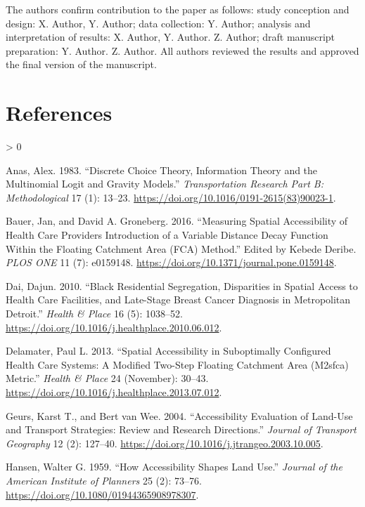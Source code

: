 \documentclass{article}
\newlength{\cslhangindent}
\newenvironment{CSLReferences}[2] %
 {%
  \setlength{\parindent}{0pt}
  \ifodd #1 \everypar{\setlength{\hangindent}{\cslhangindent}}\ignorespaces\fi
  \ifnum #2 > 0
  \setlength{\parskip}{#2\baselineskip}
  \fi
 }%
 {}
\begin{document}
The authors confirm contribution to the paper as follows: study
conception and design: X. Author, Y. Author; data collection: Y. Author;
analysis and interpretation of results: X. Author, Y. Author. Z. Author;
draft manuscript preparation: Y. Author. Z. Author. All authors reviewed
the results and approved the final version of the manuscript.

\hypertarget{references}{%
\section*{References}\label{references}}

\hypertarget{refs}{}
\begin{CSLReferences}{1}{0}
\leavevmode\hypertarget{ref-anas1983}{}%
Anas, Alex. 1983. {``Discrete Choice Theory, Information Theory and the
Multinomial Logit and Gravity Models.''} \emph{Transportation Research
Part B: Methodological} 17 (1): 13--23.
\url{https://doi.org/10.1016/0191-2615(83)90023-1}.

\leavevmode\hypertarget{ref-bauer2016}{}%
Bauer, Jan, and David A. Groneberg. 2016. {``Measuring Spatial
Accessibility of Health Care Providers {{}} Introduction of a Variable
Distance Decay Function Within the Floating Catchment Area (FCA)
Method.''} Edited by Kebede Deribe. \emph{PLOS ONE} 11 (7): e0159148.
\url{https://doi.org/10.1371/journal.pone.0159148}.

\leavevmode\hypertarget{ref-dai2010}{}%
Dai, Dajun. 2010. {``Black Residential Segregation, Disparities in
Spatial Access to Health Care Facilities, and Late-Stage Breast Cancer
Diagnosis in Metropolitan Detroit.''} \emph{Health \& Place} 16 (5):
1038--52. \url{https://doi.org/10.1016/j.healthplace.2010.06.012}.

\leavevmode\hypertarget{ref-delamater2013}{}%
Delamater, Paul L. 2013. {``Spatial Accessibility in Suboptimally
Configured Health Care Systems: A Modified Two-Step Floating Catchment
Area (M2sfca) Metric.''} \emph{Health \& Place} 24 (November): 30--43.
\url{https://doi.org/10.1016/j.healthplace.2013.07.012}.

\leavevmode\hypertarget{ref-geurs2004}{}%
Geurs, Karst T., and Bert van Wee. 2004. {``Accessibility Evaluation of
Land-Use and Transport Strategies: Review and Research Directions.''}
\emph{Journal of Transport Geography} 12 (2): 127--40.
\url{https://doi.org/10.1016/j.jtrangeo.2003.10.005}.

\leavevmode\hypertarget{ref-hansen1959}{}%
Hansen, Walter G. 1959. {``How Accessibility Shapes Land Use.''}
\emph{Journal of the American Institute of Planners} 25 (2): 73--76.
\url{https://doi.org/10.1080/01944365908978307}.


\end{CSLReferences}
\end{document}
